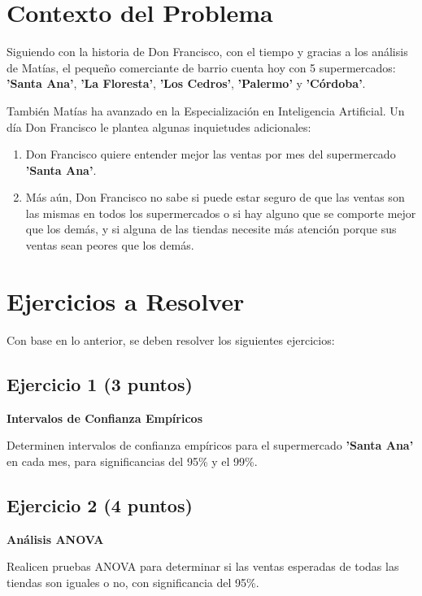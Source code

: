\documentclass[11pt,a4paper]{article}
\begin{document}
\tableofcontents
\newpage

\section{Contexto del Problema}

Siguiendo con la historia de Don Francisco, con el tiempo y gracias a los análisis de Matías, el pequeño comerciante de barrio cuenta hoy con 5 supermercados: \textbf{'Santa Ana'}, \textbf{'La Floresta'}, \textbf{'Los Cedros'}, \textbf{'Palermo'} y \textbf{'Córdoba'}.

También Matías ha avanzado en la Especialización en Inteligencia Artificial. Un día Don Francisco le plantea algunas inquietudes adicionales:

\begin{enumerate}
    \item Don Francisco quiere entender mejor las ventas por mes del supermercado \textbf{'Santa Ana'}.
    \item Más aún, Don Francisco no sabe si puede estar seguro de que las ventas son las mismas en todos los supermercados o si hay alguno que se comporte mejor que los demás, y si alguna de las tiendas necesite más atención porque sus ventas sean peores que los demás.
\end{enumerate}

\section{Ejercicios a Resolver}

Con base en lo anterior, se deben resolver los siguientes ejercicios:

\subsection{Ejercicio 1 (3 puntos)}
\textbf{Intervalos de Confianza Empíricos}

Determinen intervalos de confianza empíricos para el supermercado \textbf{'Santa Ana'} en cada mes, para significancias del 95\% y el 99\%.

\subsection{Ejercicio 2 (4 puntos)}
\textbf{Análisis ANOVA}

Realicen pruebas ANOVA para determinar si las ventas esperadas de todas las tiendas son iguales o no, con significancia del 95\%.
\end{document}
